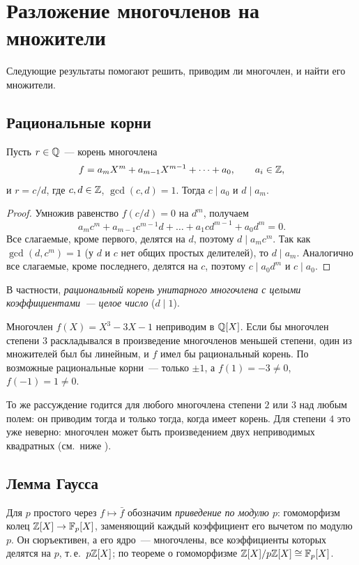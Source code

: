 \section{Разложение многочленов на множители}

Следующие результаты помогают решить, приводим ли многочлен, и найти его множители.

\subsection*{Рациональные корни}

\begin{proposition}[1.11]
Пусть $r\in\mathbb Q$~--- корень многочлена
\[
f=a_mX^m+a_{m-1}X^{m-1}+\dots+a_0,\qquad a_i\in\mathbb Z,
\]
и $r=c/d$, где $c,d\in\mathbb Z$, $\gcd(c,d)=1$. Тогда $c\mid a_0$ и $d\mid a_m$.
\end{proposition}

\begin{proof}
Умножив равенство $f(c/d)=0$ на $d^m$, получаем
\[
a_mc^m+a_{m-1}c^{m-1}d+\dots+a_1cd^{m-1}+a_0d^m=0 .
\]
Все слагаемые, кроме первого, делятся на $d$, поэтому $d\mid a_mc^m$. Так как $\gcd(d,c^m)=1$ (у $d$ и $c$ нет общих
простых делителей), то $d\mid a_m$. Аналогично все слагаемые, кроме последнего, делятся на $c$, поэтому $c\mid a_0d^m$
и $c\mid a_0$.
\end{proof}

В частности, \emph{рациональный корень унитарного многочлена с целыми коэффициентами~--- целое число} ($d\mid1$).

\begin{example}[1.12]
Многочлен $f(X)=X^3-3X-1$ неприводим в $\mathbb Q[X]$. Если бы многочлен степени $3$ раскладывался в произведение многочленов
меньшей степени, один из множителей был бы линейным, и $f$ имел бы рациональный корень. По  возможные
рациональные корни~--- только $\pm1$, а $f(1)=-3\ne0$, $f(-1)=1\ne0$.
\end{example}

То же рассуждение годится для любого многочлена степени $2$ или $3$ над любым полем: он приводим тогда и только тогда,
когда имеет корень. Для степени $4$ это уже неверно: многочлен может быть произведением двух неприводимых квадратных
(см.\ ниже ).

\subsection*{Лемма Гаусса}

Для $p$ простого через $f\mapsto\bar f$ обозначим \emph{приведение по модулю $p$}: гомоморфизм колец $\mathbb Z[X]\to\mathbb F_p[X]$,
заменяющий каждый коэффициент его вычетом по модулю $p$. Он сюръективен, а его ядро~--- многочлены, все коэффициенты
которых делятся на $p$, т.\,е.\ $p\mathbb Z[X]$; по теореме о гомоморфизме $\mathbb Z[X]/p\mathbb Z[X]\cong\mathbb F_p[X]$.

